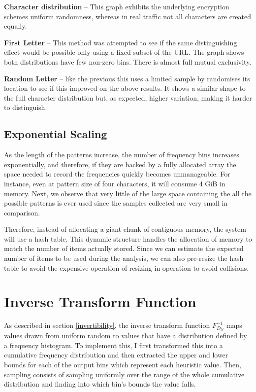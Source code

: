 \documentclass[ %
                    author={Samuel Russell},
                supervisor={Prof. Bogdan Warinschi},
                    degree={MEng},
                     title={Innocuous Ciphertexts},
                  subtitle={The DE-CENSOR Scheme},
                      type={research},
                      year={2018} ]{dissertation}
\begin{document}
\textbf{Character distribution} -- This graph exhibits the underlying encryption schemes uniform randomness, whereas in real traffic not all characters are created equally.

\textbf{First Letter} -- This method was attempted to see if the same distinguishing effect would be possible only using a fixed subset of the URL.
The graph shows both distributions have few non-zero bins. There is almost full mutual exclusivity. 

\textbf{Random Letter} -- like the previous this uses a limited sample by randomises its location to see if this improved on the above results. It shows a similar shape to the full character distribution but, as expected, higher variation, making it harder to distinguish.

\subsection{Exponential Scaling}

As the length of the patterns increase, the number of frequency bins increases exponentially, and therefore, if they are backed by a fully allocated array the space needed to record the frequencies quickly becomes unmanageable.
For instance, even at pattern size of four characters, it will consume 4 GiB in memory.
Next, we observe that very little of the large space containing the all the possible patterns is ever used since the samples collected are very small in comparison.

Therefore, instead of allocating a giant chunk of contiguous memory, the system will use a hash table.
This dynamic structure handles the allocation of memory to match the number of items actually stored.
Since we can estimate the expected number of items to be used during the analysis, we can also pre-resize the hash table to avoid the expensive operation of resizing in operation to avoid collisions.

\section{Inverse Transform Function}

As described in section \ref{invertibility}, the inverse transform function $F^{-1}_{D_N}$ maps values drawn from uniform random to values that have a distribution defined by a frequency histogram.
To implement this, I first transformed this into a cumulative frequency distribution and then extracted the upper and lower bounds for each of the output bins which represent each heuristic value.
Then, sampling consists of sampling uniformly over the range of the whole cumulative distribution and finding into which bin's bounds the value falls.
\end{document}
